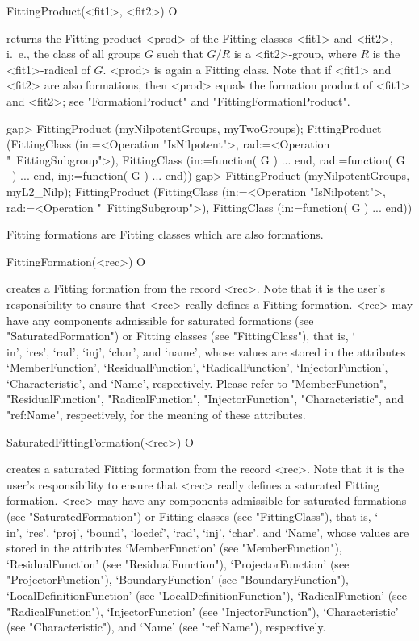 \>FittingProduct(<fit1>, <fit2>) O

returns the Fitting product <prod> of the Fitting classes <fit1> and <fit2>,
i.~e., the class of all groups $G$ such that $G/R$ is  a <fit2>-group, where
$R$ is the <fit1>-radical of $G$.  <prod> is again a Fitting class.
Note that if <fit1> and <fit2> are also
formations, then <prod> equals the
formation product of <fit1> and <fit2>; see "FormationProduct" 
and
"FittingFormationProduct".

\beginexample
gap> FittingProduct (myNilpotentGroups, myTwoGroups);
FittingProduct (FittingClass (in:=<Operation "IsNilpotent">, rad:=<Operation "\
FittingSubgroup">), FittingClass (in:=function( G ) ... end, rad:=function( G \
) ... end, inj:=function( G ) ... end))
gap> FittingProduct (myNilpotentGroups, myL2_Nilp);
FittingProduct (FittingClass (in:=<Operation "IsNilpotent">, rad:=<Operation "\
FittingSubgroup">), FittingClass (in:=function( G ) ... end))
\endexample


\null

\index{Fitting formations!creating}

Fitting formations are Fitting classes which are also formations.

\>FittingFormation(<rec>) O

creates a Fitting formation from the record <rec>. Note that it is the user's 
responsibility to ensure that <rec> really defines a Fitting formation.
<rec> may  have any components admissible for saturated formations (see
"SaturatedFormation")  or Fitting classes (see "FittingClass"), that is,
`\\in', `res', `rad', `inj', `char', and `name', 
 whose values are stored in the attributes `MemberFunction',
`ResidualFunction', `RadicalFunction',
`InjectorFunction', `Characteristic', and `Name', respectively.
Please refer
to "MemberFunction",  "ResidualFunction", "RadicalFunction",
"InjectorFunction",  "Characteristic", and "ref:Name", respectively, for the
meaning of these attributes.


\>SaturatedFittingFormation(<rec>) O

creates a saturated Fitting formation from the record <rec>. Note that it is the user's responsibility to ensure that <rec> really
defines a saturated Fitting formation. <rec> may have any
components admissible for saturated formations (see "SaturatedFormation") or
Fitting classes (see "FittingClass"), that is, `\\in', `res', `proj',
`bound', `locdef', `rad', `inj',   `char', and `Name', whose values are
stored in the attributes `MemberFunction' (see "MemberFunction"),
`ResidualFunction' (see "ResidualFunction"),
 `ProjectorFunction' (see "ProjectorFunction"), `BoundaryFunction' (see
"BoundaryFunction"), `LocalDefinitionFunction' (see
"LocalDefinitionFunction"), `RadicalFunction' (see "RadicalFunction"),
`InjectorFunction' (see "InjectorFunction"), `Characteristic' (see
"Characteristic"), and `Name' (see "ref:Name"), respectively.



